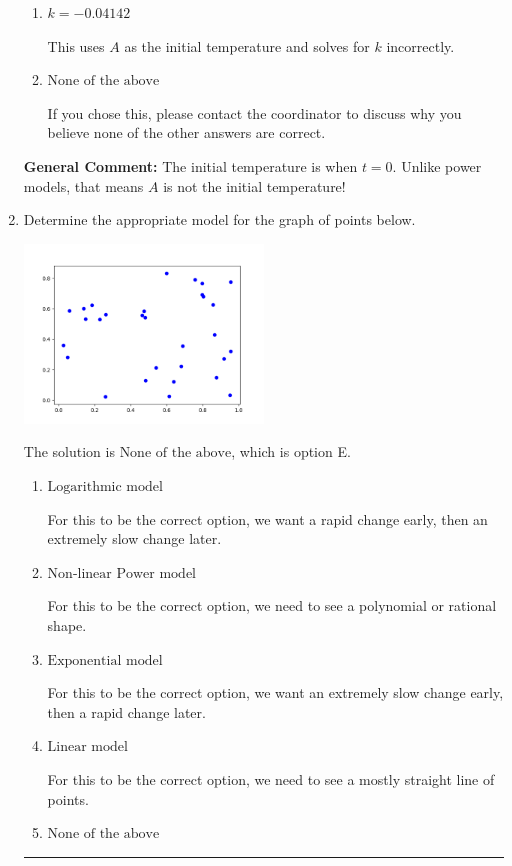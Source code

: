 \documentclass{extbook}[14pt]
\newcommand{\litem}[1]{\item #1

\rule{\textwidth}{0.4pt}}
\begin{document}
\begin{enumerate}
{\begin{enumerate}[label=\Alph*.]
* This is the correct option.
\item \( k = -0.04142 \)

This uses $A$ as the initial temperature and solves for $k$ incorrectly.
\item \( \text{None of the above} \)

If you chose this, please contact the coordinator to discuss why you believe none of the other answers are correct.
\end{enumerate}

\textbf{General Comment:} The initial temperature is when $t = 0$. Unlike power models, that means $A$ is not the initial temperature!
}
\litem{
Determine the appropriate model for the graph of points below.

\begin{center}
    \includegraphics[width=0.5\textwidth]{../Figures/identifyModelGraph11CopyC.png}
\end{center}




The solution is \( \text{None of the above} \), which is option E.\begin{enumerate}[label=\Alph*.]
\item \( \text{Logarithmic model} \)

For this to be the correct option, we want a rapid change early, then an extremely slow change later.
\item \( \text{Non-linear Power model} \)

For this to be the correct option, we need to see a polynomial or rational shape.
\item \( \text{Exponential model} \)

For this to be the correct option, we want an extremely slow change early, then a rapid change later.
\item \( \text{Linear model} \)

For this to be the correct option, we need to see a mostly straight line of points.
\item \( \text{None of the above} \)


\end{enumerate}}
\end{enumerate}
\end{document}
